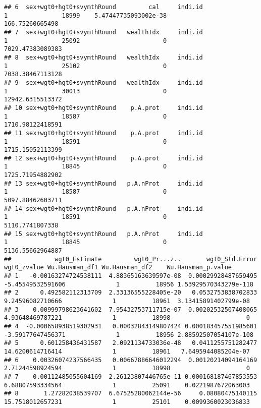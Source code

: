 \documentclass[
]{book}
\begin{document}
\begin{verbatim}
## 6  sex+wgt0+hgt0+svymthRound         cal     indi.id                   1               18999    5.47447735093002e-38           166.75260665498
## 7  sex+wgt0+hgt0+svymthRound   wealthIdx     indi.id                   1               25092                       0          7029.47383089383
## 8  sex+wgt0+hgt0+svymthRound   wealthIdx     indi.id                   1               25102                       0          7038.38467113128
## 9  sex+wgt0+hgt0+svymthRound   wealthIdx     indi.id                   1               30013                       0          12942.6315513372
## 10 sex+wgt0+hgt0+svymthRound    p.A.prot     indi.id                   1               18587                       0          1710.98122418591
## 11 sex+wgt0+hgt0+svymthRound    p.A.prot     indi.id                   1               18591                       0          1715.15052113399
## 12 sex+wgt0+hgt0+svymthRound    p.A.prot     indi.id                   1               18845                       0          1725.71954882902
## 13 sex+wgt0+hgt0+svymthRound   p.A.nProt     indi.id                   1               18587                       0          5097.88462603711
## 14 sex+wgt0+hgt0+svymthRound   p.A.nProt     indi.id                   1               18591                       0           5110.7741807338
## 15 sex+wgt0+hgt0+svymthRound   p.A.nProt     indi.id                   1               18845                       0          5136.55662964887
##            wgt0_Estimate         wgt0_Pr...z..       wgt0_Std.Error       wgt0_zvalue Wu.Hausman_df1 Wu.Hausman_df2    Wu.Hausman_p.value
## 1   -0.00163274724538111  4.88365163639597e-08  0.00029928487659495 -5.45549532591606              1          18956 1.53929570343279e-118
## 2      0.492582112313709  2.33136555228405e-20   0.0532753838702833  9.24596082710666              1          18961  3.13415891402799e-08
## 3    0.00999798623641602  7.95432753711715e-07  0.00202532507408065  4.93648469787221              1          18998                     0
## 4  -0.000658938519302931   0.00032843149807424 0.000183457551985601 -3.59177647456371              1          18956 2.88592507054107e-108
## 5      0.601258436431587   2.0921134733036e-48   0.0411255751282477  14.6200614716414              1          18961   7.6495944085204e-07
## 6    0.00326074237566435   0.00667886646012294  0.00120214094164169  2.71244598924594              1          18998                     0
## 7    0.00112485055604169  2.26123807446765e-11 0.000168187467853553  6.68807593334564              1          25091    0.0221987672063003
## 8       1.27282038539707  6.67525280062144e-56     0.08080475140115  15.7518012657231              1          25101    0.0099360023036833

\end{verbatim}
\end{document}
